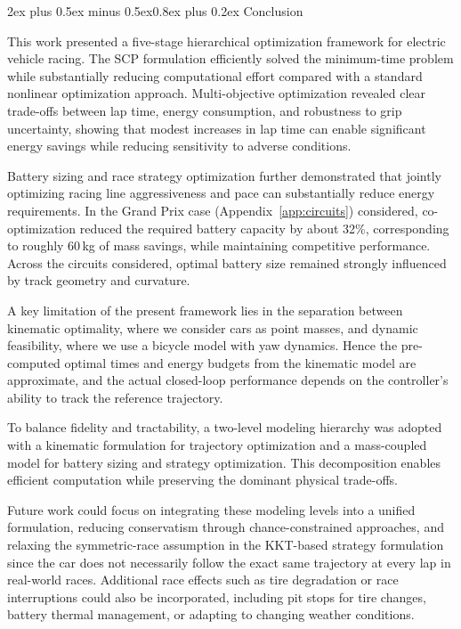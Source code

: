 \documentclass[conf]{new-aiaa}
\makeatletter
\renewcommand\section{\@startsection{section}{1}{\z@}%
  {2ex plus 0.5ex minus 0.5ex}{0.8ex plus 0.2ex}%
  {\normalfont\large\bfseries\centering}}
\makeatother
\begin{document}
\section{Conclusion}

This work presented a five-stage hierarchical optimization framework for electric vehicle racing.
The SCP formulation efficiently solved the minimum-time problem while substantially reducing
computational effort compared with a standard nonlinear optimization approach. Multi-objective
optimization revealed clear trade-offs between lap time, energy consumption, and robustness to
grip uncertainty, showing that modest increases in lap time can enable significant energy savings
while reducing sensitivity to adverse conditions.

Battery sizing and race strategy optimization further demonstrated that jointly optimizing racing
line aggressiveness and pace can substantially reduce energy requirements. In the Grand Prix case
(Appendix~\ref{app:circuits}) considered, co-optimization reduced the required battery capacity by
about 32\%, corresponding to roughly 60\,kg of mass savings, while maintaining competitive
performance. Across the circuits considered, optimal battery size remained strongly influenced by
track geometry and curvature.

A key limitation of the present framework lies in the separation between kinematic optimality,
where we consider cars as point masses, and dynamic feasibility, where we use a bicycle model with
yaw dynamics. Hence the pre-computed optimal times and energy budgets from the kinematic model are
approximate, and the actual closed-loop performance depends on the controller's ability to track
the reference trajectory.

To balance fidelity and tractability, a two-level modeling hierarchy was adopted with a kinematic
formulation for trajectory optimization and a mass-coupled model for battery sizing and strategy
optimization. This decomposition enables efficient computation while preserving the dominant
physical trade-offs.

Future work could focus on integrating these modeling levels into a unified formulation, reducing
conservatism through chance-constrained approaches, and relaxing the symmetric-race assumption in
the KKT-based strategy formulation since the car does not necessarily follow the exact same
trajectory at every lap in real-world races. Additional race effects such as tire degradation or
race interruptions could also be incorporated, including pit stops for tire changes, battery
thermal management, or adapting to changing weather conditions.
\end{document}
